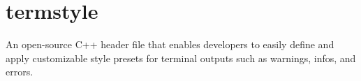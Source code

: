 \chapter{termstyle}
\hypertarget{md__r_e_a_d_m_e}{}\label{md__r_e_a_d_m_e}
\label{md__r_e_a_d_m_e_autotoc_md0}%
%
An open-\/source C++ header file that enables developers to easily define and apply customizable style presets for terminal outputs such as warnings, infos, and errors. 